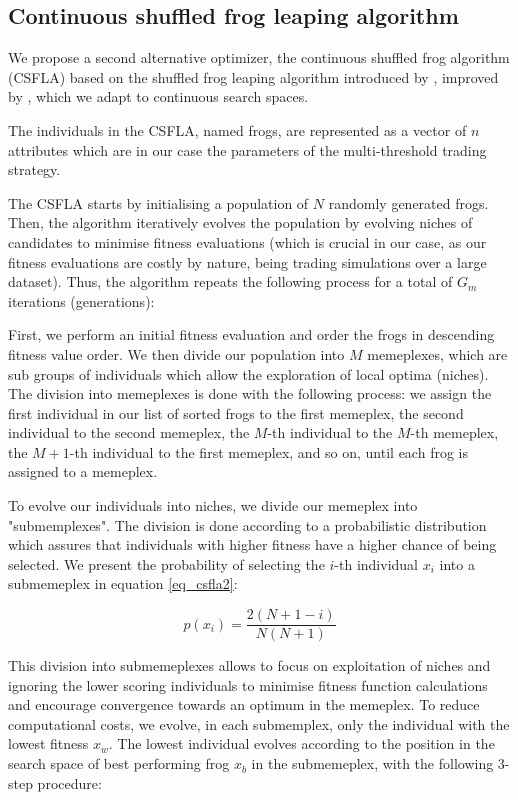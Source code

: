\documentclass[conference]{IEEEtran}
\begin{document}
\subsection{Continuous shuffled frog leaping algorithm}\label{subsection_csfla}

We propose a second alternative optimizer, the continuous shuffled frog algorithm (CSFLA) based on the shuffled frog leaping algorithm introduced by \cite{sfla_origin_paper}, improved by  \cite{csfla_origin_paper}, which we adapt to continuous search spaces. 

The individuals in the CSFLA, named frogs, are represented as a vector of \(n\) attributes which are in our case the parameters of the multi-threshold trading strategy. 

The CSFLA starts by initialising a population of  \(N\) randomly generated frogs. Then, the algorithm iteratively evolves the population by evolving niches of candidates to minimise fitness evaluations (which is crucial in our case, as our fitness evaluations are costly by nature, being trading simulations over a large dataset). Thus, the algorithm repeats the following process for a total of \(G_{m}\) iterations (generations):

First, we perform an initial fitness evaluation and order the frogs in descending fitness value order.
We then divide our population into \(M\) memeplexes, which are sub groups of individuals which allow the exploration of local optima (niches). The division into memeplexes is done with the following process:  we assign the first individual in our list of sorted frogs to the first memeplex, the second individual to the second memeplex, the \(M\)-th individual to the \(M\)-th memeplex, the \(M+1\)-th individual to the first memeplex, and so on, until each frog is assigned to a memeplex.

To evolve our individuals into niches, we divide our memeplex into "submemplexes". The division is done according to a probabilistic distribution which assures that individuals with higher fitness have a higher chance of being selected. We present the probability of selecting the \(i\)-th individual \(x_{i}\) into a submemeplex in equation \ref{eq_csfla2}:

\begin{equation}
p(x_{i})=\frac{2(N+1-i)}{N(N+1)}\label{eq_csfla2}
\end{equation}

This division into submemeplexes allows to focus on exploitation of niches and ignoring the lower scoring individuals to minimise fitness function calculations and encourage convergence towards an optimum in the memeplex. 
To reduce computational costs, we evolve, in each submemplex, only the individual with the lowest fitness \(x_{w}\). The lowest individual evolves according to the position in the search space of best performing frog \(x_{b}\) in the submemeplex, with the following 3-step procedure:
\end{document}
